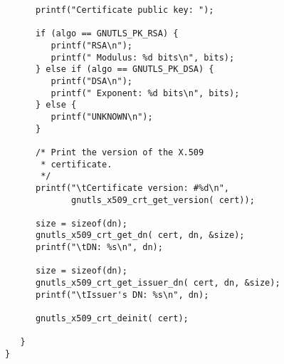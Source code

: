 \begin{verbatim}
      printf("Certificate public key: ");

      if (algo == GNUTLS_PK_RSA) {
         printf("RSA\n");
         printf(" Modulus: %d bits\n", bits);
      } else if (algo == GNUTLS_PK_DSA) {
         printf("DSA\n");
         printf(" Exponent: %d bits\n", bits);
      } else {
         printf("UNKNOWN\n");
      }

      /* Print the version of the X.509 
       * certificate.
       */
      printf("\tCertificate version: #%d\n",
             gnutls_x509_crt_get_version( cert));

      size = sizeof(dn);
      gnutls_x509_crt_get_dn( cert, dn, &size);
      printf("\tDN: %s\n", dn);

      size = sizeof(dn);
      gnutls_x509_crt_get_issuer_dn( cert, dn, &size);
      printf("\tIssuer's DN: %s\n", dn);

      gnutls_x509_crt_deinit( cert);

   }
}

\end{verbatim}

